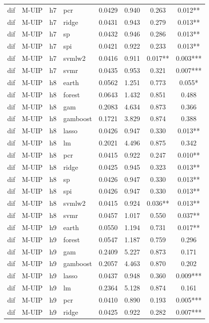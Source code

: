 \begin{ThreePartTable}
\begin{longtable}[t]{llclcccc}
dif & M-UIP & h7 & pcr & 0.0429 & 0.940 & 0.263 & 0.012**\\
dif & M-UIP & h7 & ridge & 0.0431 & 0.943 & 0.279 & 0.013**\\
dif & M-UIP & h7 & sp & 0.0432 & 0.946 & 0.286 & 0.013**\\
dif & M-UIP & h7 & spi & 0.0421 & 0.922 & 0.233 & 0.013**\\
dif & M-UIP & h7 & svmlw2 & 0.0416 & 0.911 & 0.017** & 0.003***\\
dif & M-UIP & h7 & svmr & 0.0435 & 0.953 & 0.321 & 0.007***\\
\addlinespace
dif & M-UIP & h8 & earth & 0.0562 & 1.251 & 0.773 & 0.055*\\
dif & M-UIP & h8 & forest & 0.0643 & 1.432 & 0.851 & 0.488\\
dif & M-UIP & h8 & gam & 0.2083 & 4.634 & 0.873 & 0.366\\
dif & M-UIP & h8 & gamboost & 0.1721 & 3.829 & 0.874 & 0.388\\
dif & M-UIP & h8 & lasso & 0.0426 & 0.947 & 0.330 & 0.013**\\
dif & M-UIP & h8 & lm & 0.2021 & 4.496 & 0.875 & 0.342\\
dif & M-UIP & h8 & pcr & 0.0415 & 0.922 & 0.247 & 0.010**\\
dif & M-UIP & h8 & ridge & 0.0425 & 0.945 & 0.323 & 0.013**\\
dif & M-UIP & h8 & sp & 0.0426 & 0.947 & 0.330 & 0.013**\\
dif & M-UIP & h8 & spi & 0.0426 & 0.947 & 0.330 & 0.013**\\
dif & M-UIP & h8 & svmlw2 & 0.0415 & 0.924 & 0.036** & 0.013**\\
dif & M-UIP & h8 & svmr & 0.0457 & 1.017 & 0.550 & 0.037**\\
\addlinespace
dif & M-UIP & h9 & earth & 0.0550 & 1.194 & 0.731 & 0.017**\\
dif & M-UIP & h9 & forest & 0.0547 & 1.187 & 0.759 & 0.296\\
dif & M-UIP & h9 & gam & 0.2409 & 5.227 & 0.873 & 0.171\\
dif & M-UIP & h9 & gamboost & 0.2057 & 4.463 & 0.870 & 0.202\\
dif & M-UIP & h9 & lasso & 0.0437 & 0.948 & 0.360 & 0.009***\\
dif & M-UIP & h9 & lm & 0.2364 & 5.128 & 0.874 & 0.161\\
dif & M-UIP & h9 & pcr & 0.0410 & 0.890 & 0.193 & 0.005***\\
dif & M-UIP & h9 & ridge & 0.0425 & 0.922 & 0.282 & 0.007***\\

\end{longtable}
\end{ThreePartTable}
